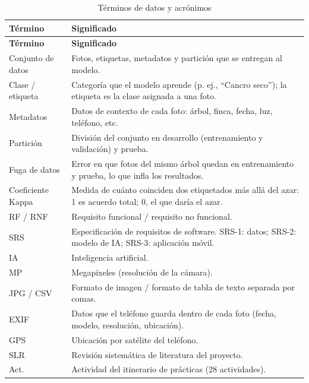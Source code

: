 \documentclass[11pt]{article}
\begin{document}
{\small
\begin{longtable}{|>{\RaggedRight\arraybackslash}p{3.91cm}|>{\RaggedRight\arraybackslash}p{10.95cm}|}
\caption{Términos de datos y acrónimos}\\
\hline
\rowcolor{encabezado}\textbf{Término} & \textbf{Significado} \\ \hline
\endfirsthead
\hline
\rowcolor{encabezado}\textbf{Término} & \textbf{Significado} \\ \hline
\endhead
Conjunto de datos & Fotos, etiquetas, metadatos y partición que se entregan al modelo. \\ \hline
Clase / etiqueta & Categoría que el modelo aprende (p. ej., “Cancro seco”); la etiqueta es la clase asignada a una foto. \\ \hline
Metadatos & Datos de contexto de cada foto: árbol, finca, fecha, luz, teléfono, etc. \\ \hline
Partición & División del conjunto en desarrollo (entrenamiento y validación) y prueba. \\ \hline
Fuga de datos & Error en que fotos del mismo árbol quedan en entrenamiento y prueba, lo que infla los resultados. \\ \hline
Coeficiente Kappa & Medida de cuánto coinciden dos etiquetados más allá del azar: 1 es acuerdo total; 0, el que daría el azar. \\ \hline
RF / RNF & Requisito funcional / requisito no funcional. \\ \hline
SRS & Especificación de requisitos de software. SRS-1: datos; SRS-2: modelo de IA; SRS-3: aplicación móvil. \\ \hline
IA & Inteligencia artificial. \\ \hline
MP & Megapíxeles (resolución de la cámara). \\ \hline
JPG / CSV & Formato de imagen / formato de tabla de texto separada por comas. \\ \hline
EXIF & Datos que el teléfono guarda dentro de cada foto (fecha, modelo, resolución, ubicación). \\ \hline
GPS & Ubicación por satélite del teléfono. \\ \hline
SLR & Revisión sistemática de literatura del proyecto. \\ \hline
Act. & Actividad del itinerario de prácticas (28 actividades). \\ \hline
\end{longtable}}
\end{document}
